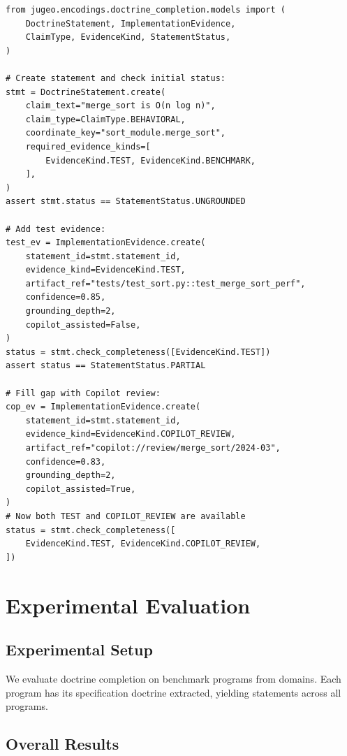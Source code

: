 \documentclass[11pt]{article}
\begin{document}
\begin{lstlisting}[style=jugeo-python]
from jugeo.encodings.doctrine_completion.models import (
    DoctrineStatement, ImplementationEvidence,
    ClaimType, EvidenceKind, StatementStatus,
)

# Create statement and check initial status:
stmt = DoctrineStatement.create(
    claim_text="merge_sort is O(n log n)",
    claim_type=ClaimType.BEHAVIORAL,
    coordinate_key="sort_module.merge_sort",
    required_evidence_kinds=[
        EvidenceKind.TEST, EvidenceKind.BENCHMARK,
    ],
)
assert stmt.status == StatementStatus.UNGROUNDED

# Add test evidence:
test_ev = ImplementationEvidence.create(
    statement_id=stmt.statement_id,
    evidence_kind=EvidenceKind.TEST,
    artifact_ref="tests/test_sort.py::test_merge_sort_perf",
    confidence=0.85,
    grounding_depth=2,
    copilot_assisted=False,
)
status = stmt.check_completeness([EvidenceKind.TEST])
assert status == StatementStatus.PARTIAL

# Fill gap with Copilot review:
cop_ev = ImplementationEvidence.create(
    statement_id=stmt.statement_id,
    evidence_kind=EvidenceKind.COPILOT_REVIEW,
    artifact_ref="copilot://review/merge_sort/2024-03",
    confidence=0.83,
    grounding_depth=2,
    copilot_assisted=True,
)
# Now both TEST and COPILOT_REVIEW are available
status = stmt.check_completeness([
    EvidenceKind.TEST, EvidenceKind.COPILOT_REVIEW,
])
\end{lstlisting}

\section{Experimental Evaluation}\label{sec:eval}

\subsection{Experimental Setup}

We evaluate doctrine completion on \expTotalPrograms{} benchmark programs
from \expDomainCount{} domains.  Each program has its specification doctrine
extracted, yielding statements across all programs.

\subsection{Overall Results}
\end{document}
